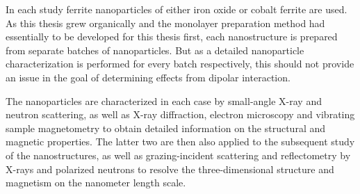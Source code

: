 \documentclass[\main/dresen_thesis.tex]{subfiles}
\begin{document}
    In each study ferrite nanoparticles of either iron oxide or cobalt ferrite are used.
    As this thesis grew organically and the monolayer preparation method had essentially to be developed for this thesis first, each nanostructure is prepared from separate batches of nanoparticles.
    But as a detailed nanoparticle characterization is performed for every batch respectively, this should not provide an issue in the goal of determining effects from dipolar interaction.

    The nanoparticles are characterized in each case by small-angle X-ray and neutron scattering, as well as X-ray diffraction, electron microscopy and vibrating sample magnetometry to obtain detailed information on the structural and magnetic properties.
    The latter two are then also applied to the subsequent study of the nanostructures, as well as grazing-incident scattering and reflectometry by X-rays and polarized neutrons to resolve the three-dimensional structure and magnetism on the nanometer length scale.
\end{document}
